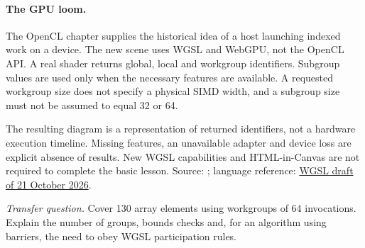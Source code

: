 {  \paragraph{The GPU loom.}
  \par The OpenCL chapter supplies the historical idea of a host launching indexed work on a device. The new scene uses WGSL and WebGPU, not the OpenCL API. A real shader returns global, local and workgroup identifiers. Subgroup values are used only when the necessary features are available. A requested workgroup size does not specify a physical SIMD width, and a subgroup size must not be assumed to equal 32 or 64.
  \par The resulting diagram is a representation of returned identifiers, not a hardware execution timeline. Missing features, an unavailable adapter and device loss are explicit absence of results. New WGSL capabilities and HTML-in-Canvas are not required to complete the basic lesson. Source: ; language reference: \href{https://www.w3.org/TR/2026/CRD-WGSL-20261021/}{WGSL draft of 21 October 2026}.
  \par\textit{Transfer question.} Cover 130 array elements using workgroups of 64 invocations. Explain the number of groups, bounds checks and, for an algorithm using barriers, the need to obey WGSL participation rules.

}

